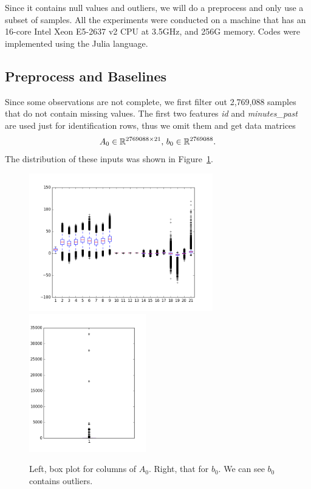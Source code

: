 Since it contains null values and outliers,
we will do a preprocess and only use a subset of samples.
All the experiments were conducted on a machine
that has an 16-core Intel Xeon E5-2637 v2 CPU at 3.5GHz,
and 256G memory.
Codes were implemented using the Julia language.

\subsection{Preprocess and Baselines} \label{sec:preprocess}

Since some observations are not complete,
we first filter out 2,769,088 samples that do not contain missing values.
The first two features \emph{id} and \emph{minutes\_past}
are used just for identification rows,
thus we omit them and
get data matrices
\begin{equation}
    A_0 \in {\mathbb{R}}^{2769088\times 21}, \,
    b_0\in{\mathbb{R}}^{2769088}.
\end{equation}
The distribution of these inputs was shown in Figure~\ref{fig:box}.
\begin{figure}[htb]
	\centering
	\includegraphics[height=6cm]{fig/box_a_0.png}
	\includegraphics[height=6cm]{fig/box_b_0.png}
	\caption{\small
		Left, box plot for columns of $A_0$.
        Right, that for $b_0$.
        We can see $b_0$ contains outliers.}
	\label{fig:box}
\end{figure}

